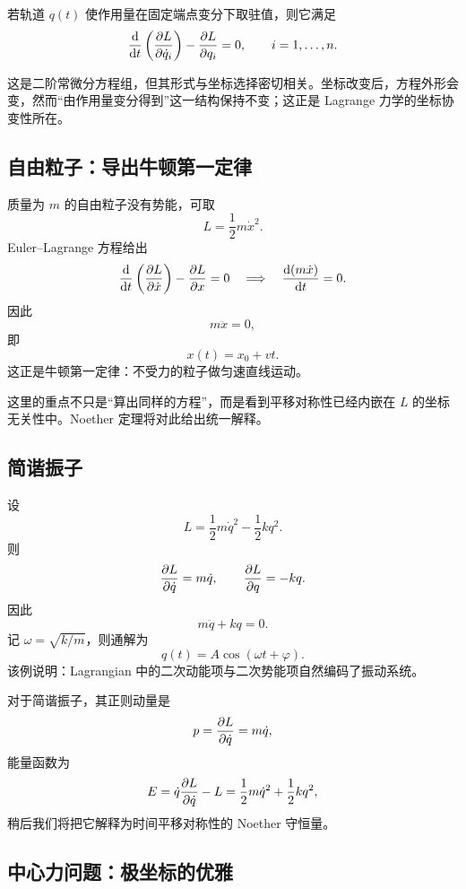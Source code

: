 \begin{theorem}
若轨道 $q(t)$ 使作用量在固定端点变分下取驻值，则它满足
\[
  \dv{}{t}\left(\pdv{L}{\dot q_i}\right)-\pdv{L}{q_i}=0,
  \qquad i=1,\dots,n.
\]
\end{theorem}

\begin{remark}
这是二阶常微分方程组，但其形式与坐标选择密切相关。坐标改变后，方程外形会变，然而“由作用量变分得到”这一结构保持不变；这正是 Lagrange 力学的坐标协变性所在。
\end{remark}

\subsection{自由粒子：导出牛顿第一定律}

\begin{example}[自由粒子]
质量为 $m$ 的自由粒子没有势能，可取
\[
  L=\frac12 m\dot x^2.
\]
Euler--Lagrange 方程给出
\[
  \dv{}{t}\left(\pdv{L}{\dot x}\right)-\pdv{L}{x}=0
  \quad\Longrightarrow\quad
  \dv{(m\dot x)}{t}=0.
\]
因此
\[
  m\ddot x=0,
\]
即
\[
  x(t)=x_0+vt.
\]
这正是牛顿第一定律：不受力的粒子做匀速直线运动。
\end{example}

这里的重点不只是“算出同样的方程”，而是看到平移对称性已经内嵌在 $L$ 的坐标无关性中。Noether 定理将对此给出统一解释。

\subsection{简谐振子}

\begin{example}[简谐振子]
设
\[
  L=\frac12 m\dot q^2-\frac12 k q^2.
\]
则
\[
  \pdv{L}{\dot q}=m\dot q,
  \qquad
  \pdv{L}{q}=-kq.
\]
因此
\[
  m\ddot q+kq=0.
\]
记 $\omega=\sqrt{k/m}$，则通解为
\[
  q(t)=A\cos(\omega t+\varphi).
\]
该例说明：Lagrangian 中的二次动能项与二次势能项自然编码了振动系统。
\end{example}

对于简谐振子，其正则动量是
\[
  p=\pdv{L}{\dot q}=m\dot q,
\]
能量函数为
\[
  E=\dot q\pdv{L}{\dot q}-L=\frac12 m\dot q^2+\frac12 kq^2,
\]
稍后我们将把它解释为时间平移对称性的 Noether 守恒量。

\subsection{中心力问题：极坐标的优雅}

